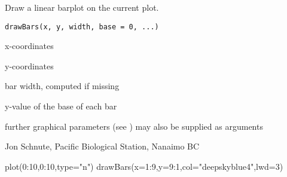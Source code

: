 \documentclass[letterpaper]{book}
\begin{document}
\begin{Description}\relax
Draw a linear barplot on the current plot.
\end{Description}
\begin{Usage}
\begin{verbatim}drawBars(x, y, width, base = 0, ...)\end{verbatim}
\end{Usage}
\begin{Arguments}
\begin{ldescription}
\item[\code{x}] x-coordinates
\item[\code{y}] y-coordinates
\item[\code{width}] bar width, computed if missing
\item[\code{base}] y-value of the base of each bar
\item[\code{...}] further graphical parameters (see ) may also be supplied as arguments
\end{ldescription}
\end{Arguments}
\begin{Author}\relax
Jon Schnute, Pacific Biological Station, Nanaimo BC
\end{Author}
\begin{Examples}
\begin{ExampleCode}
plot(0:10,0:10,type="n")
drawBars(x=1:9,y=9:1,col="deepskyblue4",lwd=3)
\end{ExampleCode}
\end{Examples}
\end{document}

